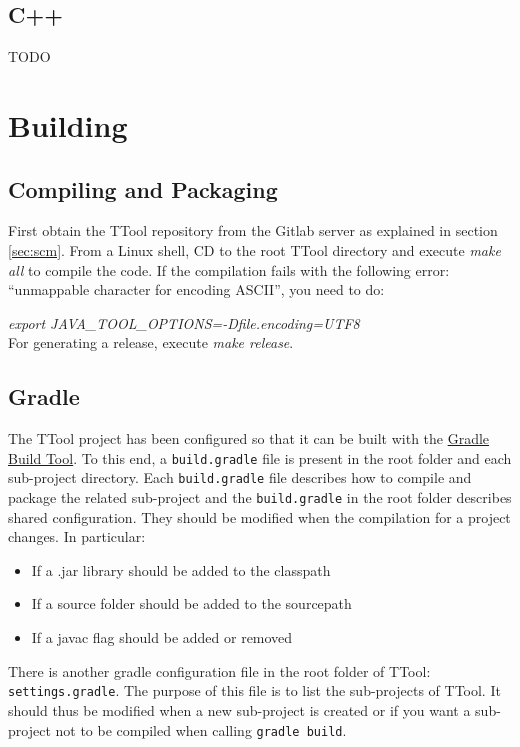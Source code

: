 \documentclass[12pt]{article}
\begin{document}
\subsection{C++}

TODO

\newpage

\section{Building}

\subsection{Compiling and Packaging}

First obtain the TTool repository from the Gitlab server as explained in section
\ref{sec:scm}. From a Linux shell, CD to the root TTool directory and execute
\emph{make all} to compile the code. If the compilation fails with the following error:
``unmappable character for encoding ASCII'', you need to do:

\emph{export JAVA\_TOOL\_OPTIONS=-Dfile.encoding=UTF8} \\

For generating a release, execute \emph{make release}.

\subsection{Gradle}
The TTool project has been configured so that it can be built with the
\href{https://gradle.org/}{Gradle Build Tool}. To this end, a
\texttt{build.gradle} file
is present in the root folder and each sub-project directory. Each
\texttt{build.gradle} file describes how to compile and package the related
sub-project and the \texttt{build.gradle} in the root folder describes shared
configuration. They should be modified when the compilation for a project
changes. In particular:
\begin{itemize}
    \item If a .jar library should be added to the classpath
    \item If a source folder should be added to the sourcepath
    \item If a javac flag should be added or removed
\end{itemize}

There is another gradle configuration file in the root folder of TTool:
\texttt{settings.gradle}. The purpose of this file is to list the sub-projects
of TTool. It should thus be modified when a new sub-project is created or if you
want a sub-project not to be compiled when calling \texttt{gradle build}.
\end{document}
